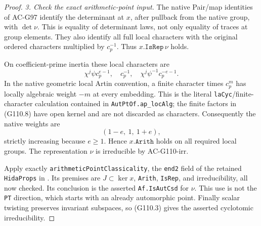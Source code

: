 \begin{proof}
\emph{3. Check the exact arithmetic-point input.}
The native Pair/map identities of AC-G97 identify the
determinant at \(x\), after pullback from the native group,
with \(\det\nu\). This is equality of determinant laws,
not only equality of traces at group elements. They also
identify all full local characters with the original
ordered characters multiplied by \(c_p^{-1}\).
Thus \(x.\texttt{IsRep}\,\nu\) holds.

On coefficient-prime inertia these local characters are
\[
       \chi^j\psi c_p^{e-1},\quad c_p^{-1},\quad
                     \chi^j\psi^{-1}c_p^{-e-1}.
 \tag{G110.8}
\]
In the native geometric local Artin convention, a finite
character times \(c_p^m\) has locally algebraic weight
\(-m\) at every embedding. This is the literal
\texttt{laCyc}/finite-character calculation contained in
\texttt{AutPtOf.ap\_locAlg}; the finite factors in (G110.8)
have open kernel and are not discarded as characters.
Consequently the native weights are
\[
                         (1-e,\ 1,\ 1+e),
 \tag{G110.9}
\]
strictly increasing because \(e\ge1\). Hence
\(x.\texttt{Arith}\) holds on all required local groups.
The representation \(\nu\) is irreducible by AC-G110-irr.

Apply exactly \texttt{arithmeticPointClassicality}, the
\texttt{end2} field of the retained \texttt{HidaProps} in
.
Its premises are \(J\subset\ker x\), \texttt{Arith},
\texttt{IsRep}, and irreducibility, all now checked.
Its conclusion is the asserted \texttt{Af.IsAutCsd} for
\(\nu\). This use is not the \texttt{PT} direction,
which starts with an already automorphic point.
Finally scalar twisting preserves invariant subspaces,
so (G110.3) gives the asserted cyclotomic irreducibility.
\end{proof}

